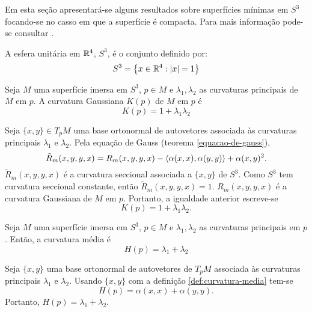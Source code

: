 Em esta seção apresentará-se alguns resultados sobre superfícies mínimas em $S^3$ focando-se no casso em que a superfície é compacta. Para mais informação pode-se consultar \cite{Brendle2013}.

\begin{definicao}
	A esfera unitária em $\mathbb{R}^4$, $S^3$, é o conjunto definido por:
	\begin{equation*}
	S^3 = \left\{ x \in \mathbb{R}^4: | x | = 1 \right\}
	\end{equation*}
\end{definicao}

\begin{proposicao}
	Seja $M$ uma superfície imersa em $S^3$,
	$p \in M$ e
	$\lambda_1, \lambda_2$ as curvaturas principais de $M$ em $p$.
	A curvatura Gaussiana $K(p)$ de $M$ em $p$ é
	\begin{equation*}
		K(p) = 1 + \lambda_1 \lambda_2
	\end{equation*}
\end{proposicao}

\begin{demonstracao}
	Seja $\{x,y\} \in T_p M$ uma base ortonormal de autovetores associada às curvaturas principais $\lambda_1$ e $\lambda_2$.
	Pela equação de Gauss (teorema \ref{equacao-de-gauss}),
	\begin{equation*}
		\tilde{R}_m(x,y,y,x) = R_m(x,y,y,x) - \left\langle \alpha(x,x),\alpha(y,y) \right\rangle + \alpha(x,y)^2.
	\end{equation*}
	$\tilde{R}_m(x,y,y,x)$ é a curvatura seccional associada a $\{x,y\}$ de $S^3$. Como $S^3$ tem curvatura seccional constante, então $\tilde{R}_m(x,y,y,x) = 1$. 
	$R_m(x,y,y,x)$ é a curvatura Gaussiana de $M$ em $p$. Portanto, a igualdade anterior escreve-se
	\begin{equation*}
		K(p) = 1 + \lambda_1 \lambda_2.
	\end{equation*}
\end{demonstracao}



\begin{proposicao}
	Seja $M$ uma superfície imersa em $S^3$,
	$p \in M$ e
	$\lambda_1, \lambda_2$ as curvaturas principais em $p$.
	Então, a curvatura média é
	\begin{equation*}
		H(p) = \lambda_1 + \lambda_2
	\end{equation*}
\end{proposicao}

\begin{demonstracao}
	Seja $\{x,y\}$ uma base ortonormal de autovetores de $T_p M$ associada às curvaturas principais $\lambda_1$ e $\lambda_2$.
	Usando $\{x,y\}$ com a definição \ref{def:curvatura-media} tem-se
	\begin{equation*}
		H(p) = \alpha(x,x) + \alpha(y,y).
	\end{equation*}
	Portanto, $H(p) = \lambda_1 + \lambda_2$.
\end{demonstracao}

